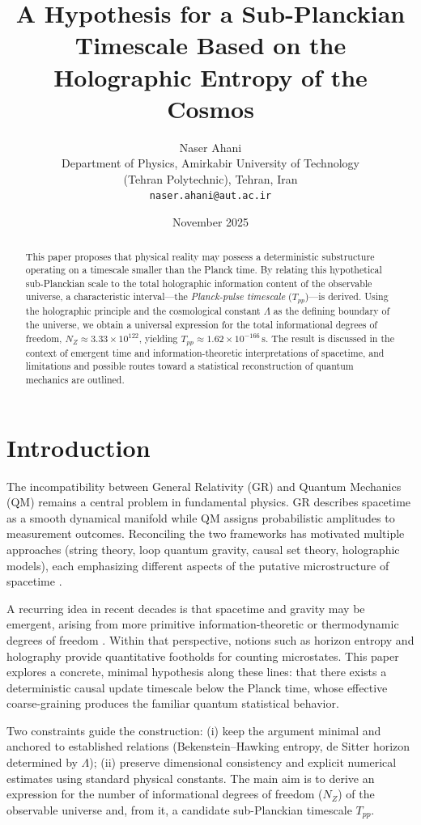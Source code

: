 \documentclass[12pt]{article}
\title{A Hypothesis for a Sub-Planckian Timescale Based on the Holographic Entropy of the Cosmos}
\author{Naser Ahani \\ Department of Physics, Amirkabir University of Technology \\ (Tehran Polytechnic), Tehran, Iran \\ \texttt{naser.ahani@aut.ac.ir}}
\date{November 2025}
\begin{document}
\maketitle

\begin{abstract}
This paper proposes that physical reality may possess a deterministic substructure operating on a timescale smaller than the Planck time. By relating this hypothetical sub-Planckian scale to the total holographic information content of the observable universe, a characteristic interval---the \textit{Planck-pulse timescale} ($T_{pp}$)---is derived. Using the holographic principle and the cosmological constant $\Lambda$ as the defining boundary of the universe, we obtain a universal expression for the total informational degrees of freedom, $N_Z \approx 3.33 \times 10^{122}$, yielding $T_{pp} \approx 1.62 \times 10^{-166}\,\mathrm{s}$. The result is discussed in the context of emergent time and information-theoretic interpretations of spacetime, and limitations and possible routes toward a statistical reconstruction of quantum mechanics are outlined.
\end{abstract}

\section{Introduction}
The incompatibility between General Relativity (GR) and Quantum Mechanics (QM) remains a central problem in fundamental physics. GR describes spacetime as a smooth dynamical manifold while QM assigns probabilistic amplitudes to measurement outcomes. Reconciling the two frameworks has motivated multiple approaches (string theory, loop quantum gravity, causal set theory, holographic models), each emphasizing different aspects of the putative microstructure of spacetime \cite{tHooft1993,Susskind1995,Rovelli2004}.

A recurring idea in recent decades is that spacetime and gravity may be emergent, arising from more primitive information-theoretic or thermodynamic degrees of freedom \cite{Jacobson1995,Padmanabhan2010,Verlinde2011}. Within that perspective, notions such as horizon entropy and holography provide quantitative footholds for counting microstates. This paper explores a concrete, minimal hypothesis along these lines: that there exists a deterministic causal update timescale below the Planck time, whose effective coarse-graining produces the familiar quantum statistical behavior.

Two constraints guide the construction: (i) keep the argument minimal and anchored to established relations (Bekenstein–Hawking entropy, de Sitter horizon determined by $\Lambda$); (ii) preserve dimensional consistency and explicit numerical estimates using standard physical constants. The main aim is to derive an expression for the number of informational degrees of freedom ($N_Z$) of the observable universe and, from it, a candidate sub-Planckian timescale $T_{pp}$.
\end{document}
